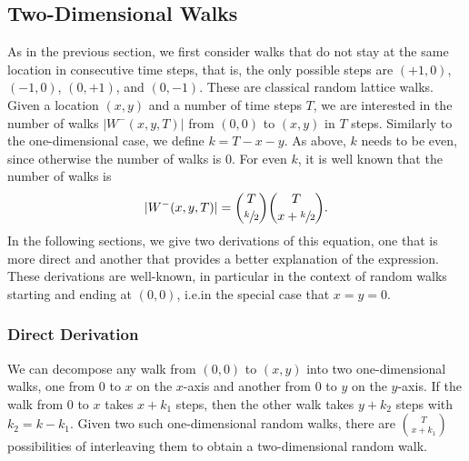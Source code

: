 \documentclass[11pt,a4paper,twoside,british]{article}
\begin{document}
\subsection{Two-Dimensional Walks}
As in the previous section, we first consider walks that do not stay at the same
location in consecutive time steps, that is, the only possible steps are
$(+1, 0)$, $(-1, 0)$, $(0, +1)$, and $(0, -1)$.
These are classical random lattice walks.
Given a location $(x, y)$ and a number of time steps $T$, we are interested in
the number of walks $\lvert W^-(x, y, T)\rvert$ from $(0, 0)$ to $(x, y)$ in $T$
steps.
Similarly to the one-dimensional case, we define $k = T - x - y$.
As above, $k$ needs to be even, since otherwise the number of walks is $0$.
For even $k$, it is well known that the number of walks is
\begin{equation}
\lvert W^-(x, y, T)\rvert =
\binom{T}{\sfrac{k}{2}}\binom{T}{x + \sfrac{k}{2}}.\label{expression:2d}
\end{equation}
In the following sections, we give two derivations of this equation, one that is
more direct and another that provides a better explanation of the expression.
These derivations are well-known, in particular in the context of random walks
starting and ending at $(0, 0)$, i.e.\@ in the special case that $x = y = 0$.

\subsubsection{Direct Derivation}
We can decompose any walk from $(0, 0)$ to $(x, y)$ into two one-dimensional
walks, one from $0$ to $x$ on the $x$-axis and another from $0$ to $y$ on the
$y$-axis.
If the walk from $0$ to $x$ takes $x + k_1$ steps, then the other walk takes
$y + k_2$ steps with $k_2 = k - k_1$.
Given two such one-dimensional random walks, there are $\binom{T}{x + k_1}$
possibilities of interleaving them to obtain a two-dimensional random walk.
\end{document}

